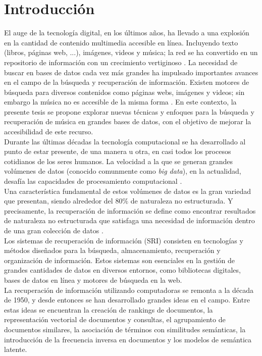 \chapter*{Introducción}\label{chapter:introduction}
El auge de la tecnología digital, en los últimos años, ha llevado a una explosión en la cantidad de contenido multimedia accesible en línea. Incluyendo texto (libros, páginas web, ...), imágenes, videos y música; la red se ha convertido en un repositorio de información con un crecimiento vertiginoso \cite{owidinternet}. La necesidad de buscar en bases de datos cada vez más grandes ha impulsado importantes avances en el campo de la búsqueda y recuperación de información. Existen motores de búsqueda para diversos contenidos como páginas webs, imágenes y videos; sin embargo la música no es accesible de la misma forma \cite{Koepke2021AudioRW}. En este contexto, la presente tesis se propone explorar nuevas técnicas y enfoques para la búsqueda y recuperación de música en grandes bases de datos, con el objetivo de mejorar la accesibilidad de este recurso. \\

Durante las últimas décadas la tecnología computacional se ha desarrollado al punto de estar presente, de una manera u otra, en casi todos los procesos cotidianos de los seres humanos. La velocidad a la que se generan grandes volúmenes de datos (conocido comunmente como \textit{big data}), en la actualidad, desafía las capacidades de procesamiento computacional \cite{RiseofBigData}.\\
Una característica fundamental de estos volúmenes de datos es la gran variedad que presentan, siendo alrededor del 80$\%$ de naturaleza no estructurada. Y precisamente, la recuperación de información se define como encontrar resultados de naturaleza no estructurada que satisfaga una necesidad de información dentro de una gran colección de datos \cite{manning2008introductiontoIR}.\\
Los sistemas de recuperación de información (SRI) consisten en tecnologías y métodos diseñados para la búsqueda, almacenamiento, recuperación y organización de información. Estos sistemas son esenciales en la gestión de grandes cantidades de datos en diversos entornos, como bibliotecas digitales, bases de datos en línea y motores de búsqueda en la web.\\ 
La recuperación de información utilizando computadoras  se remonta a la década de 1950, y desde entonces se han desarrollado grandes ideas en el campo. Entre estas ideas se encuentran la creación de rankings de documentos, la representación vectorial de documentos y consultas, el agrupamiento de documentos similares, la asociación de términos con similitudes semánticas, la introducción de la frecuencia inversa en documentos y los modelos de semántica latente.\\ %

